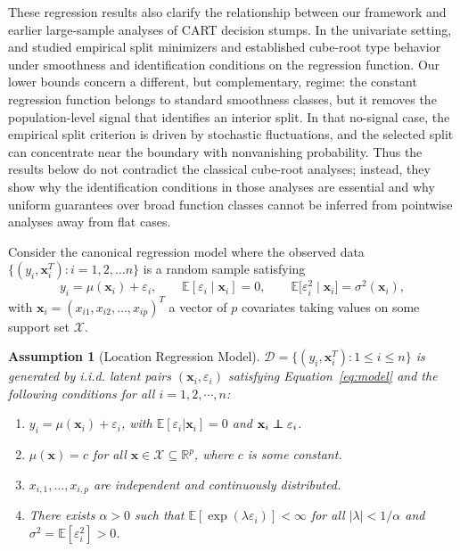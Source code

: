 \documentclass[10pt]{article}
\newcommand\independent{\protect\mathpalette{\protect\independenT}{\perp}}
\def\independenT#1#2{\mathrel{\rlap{$#1#2$}\mkern2mu{#1#2}}}
\def\bx{\mathbf{x}}
\def\E{\mathbb{E}}
\def\dataD{\mathcal{D}}
\newtheorem{assumption}{Assumption}
\theoremstyle{definition}
\theoremstyle{remark}
\begin{document}
These regression results also clarify the relationship between our framework and earlier large-sample analyses of CART decision stumps. In the univariate setting, \citet{Buhlmann-Yu_2002_AOS} and \citet{Banerjee-McKeague_2007_AOS} studied empirical split minimizers and established cube-root type behavior under smoothness and identification conditions on the regression function. Our lower bounds concern a different, but complementary, regime: the constant regression function belongs to standard smoothness classes, but it removes the population-level signal that identifies an interior split. In that no-signal case, the empirical split criterion is driven by stochastic fluctuations, and the selected split can concentrate near the boundary with nonvanishing probability. Thus the results below do not contradict the classical cube-root analyses; instead, they show why the identification conditions in those analyses are essential and why uniform guarantees over broad function classes cannot be inferred from pointwise analyses away from flat cases.

Consider the canonical regression model where the observed data $\{(y_i,\bx_i^T) : i = 1, 2, \dots n\}$ is a random sample satisfying 
\begin{equation} \label{eq:model}
y_i = \mu(\bx_i)+ \varepsilon_i, \qquad \mathbb{E}[\varepsilon_i \mid \bx_i]=0, \qquad \mathbb{E}\big[\varepsilon_i^2 \mid \bx_i\big]=\sigma^2(\bx_i),
\end{equation}
with $\bx_i = (x_{i1}, x_{i2}, \dots, x_{ip})^T$ a vector of $p$ covariates taking values on some support set $\mathcal{X}$.

\begin{assumption}[Location Regression Model]\label{sa-ass:DGP}
    $\dataD = \{(y_i,\bx_i^T) : 1 \leq i \leq n\}$ is generated by i.i.d. latent pairs $(\bx_i,\varepsilon_i)$ satisfying Equation~\eqref{eq:model} and the following conditions for all $i = 1,2, \cdots, n$:
    \begin{enumerate}
        \item $y_i = \mu(\bx_i)+ \varepsilon_i$, with $\mathbb{E}[\varepsilon_i | \bx_i]=0$ and $\bx_i \independent \varepsilon_i$.
        \item $ \mu(\bx) = c$ for all $\bx \in \mathcal{X}\subseteq\mathbb{R}^p$, where $c$ is some constant.
        \item $x_{i,1}, \ldots, x_{i,p}$ are independent and continuously distributed.
        \item There exists $\alpha > 0$ such that  $\E[\exp(\lambda\varepsilon_i)] < \infty$ for all $|\lambda| < 1/\alpha $ and $\sigma^2 = \E[\varepsilon_i^2] > 0$. 
    \end{enumerate}
\end{assumption}
\end{document}
